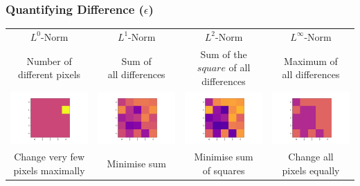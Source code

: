 \documentclass[10pt,usepdftitle=false,aspectratio=169]{beamer}
\begin{document}
\begin{frame}[fragile]
	\frametitle{Quantifying Difference ($\epsilon$)}

	\begin{tabular}{cccc}
		
	$L^0$-Norm & 	$L^1$-Norm & 	$L^2$-Norm & 	$L^\infty$-Norm \vspace{5pt} \\
	
	
	
	\shortstack{Number of \\ different pixels} & \shortstack{Sum of \\ all differences} & \shortstack{Sum of the $square$ \\ of all differences} & \shortstack{Maximum of \\ all differences} \\
	
	\includegraphics[align=c,width=0.3\columnwidth]{plots/L0.png} &
	\includegraphics[align=c,width=0.3\columnwidth]{plots/L1.png} &
	\includegraphics[align=c,width=0.3\columnwidth]{plots/L2.png} &
	\includegraphics[align=c,width=0.3\columnwidth]{plots/Linf.png} 
	\\
	
	\shortstack{Change very few \\ pixels maximally}&Minimise sum&\shortstack{Minimise sum \\ of squares}&\shortstack{Change all \\ pixels equally}
	\end{tabular}
\end{frame}
\end{document}

